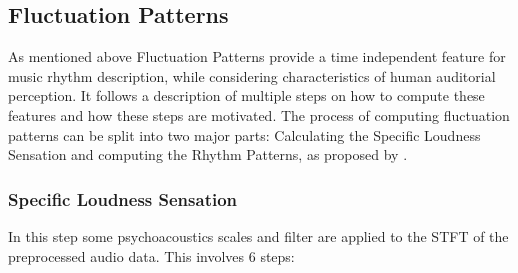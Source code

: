 \documentclass[cic,tc,english]{iiufrgs}
\begin{document}
\subsection{Fluctuation Patterns}
As mentioned above Fluctuation Patterns provide a time independent feature for music rhythm description, while considering characteristics of human auditorial perception. It follows a description of multiple steps on how to compute these features and how these steps are motivated. The process of computing fluctuation patterns can be split into two major parts: Calculating the Specific Loudness Sensation and computing the Rhythm Patterns, as proposed by \cite{pampalk2001islands}.
\subsubsection{Specific Loudness Sensation}
In this step some psychoacoustics scales and filter are applied to the STFT of the preprocessed audio data. This involves 6 steps:
\end{document}
